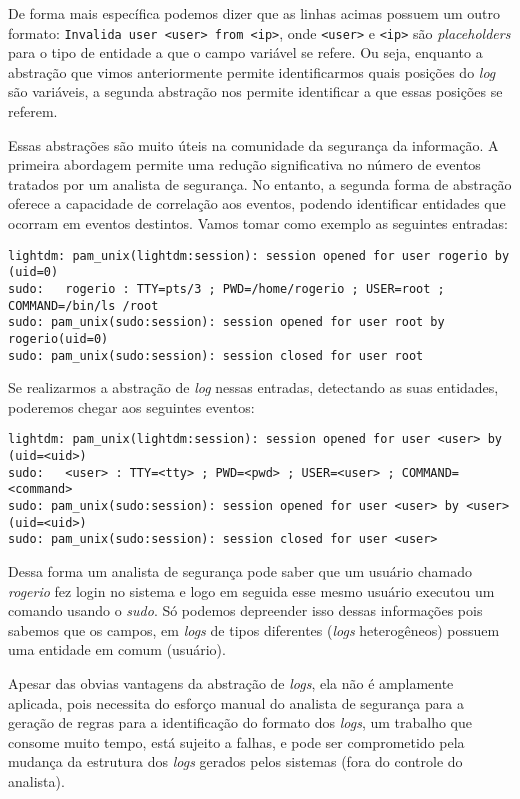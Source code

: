 \documentclass[
	12pt,				%
	openright,			%
	twoside,			%
	a4paper,			%
	english,			%
	spanish,			%
	brazil,				%
	]{abntex2}
\begin{document}
De forma mais específica podemos dizer que as linhas acimas possuem um outro formato: \verb|Invalida user <user> from <ip>|, onde \verb|<user>| e \verb|<ip>| são \emph{placeholders} para o tipo de entidade a que o campo variável se refere. Ou seja, enquanto a abstração que vimos anteriormente permite identificarmos quais posições do \emph{log} são variáveis, a segunda abstração nos permite identificar a que essas posições se referem.

Essas abstrações são muito úteis na comunidade da segurança da informação. A primeira abordagem permite uma redução significativa no número de eventos tratados por um analista de segurança. No entanto, a segunda forma de abstração oferece a capacidade de correlação aos eventos, podendo identificar entidades que ocorram em eventos destintos. Vamos tomar como exemplo as seguintes entradas:

{\small
\begin{verbatim}
lightdm: pam_unix(lightdm:session): session opened for user rogerio by (uid=0)
sudo:   rogerio : TTY=pts/3 ; PWD=/home/rogerio ; USER=root ; COMMAND=/bin/ls /root
sudo: pam_unix(sudo:session): session opened for user root by rogerio(uid=0)
sudo: pam_unix(sudo:session): session closed for user root
\end{verbatim}
}

Se realizarmos a abstração de \emph{log} nessas entradas, detectando as suas entidades, poderemos chegar aos seguintes eventos:

{\small
\begin{verbatim}
lightdm: pam_unix(lightdm:session): session opened for user <user> by (uid=<uid>)
sudo:   <user> : TTY=<tty> ; PWD=<pwd> ; USER=<user> ; COMMAND=<command>
sudo: pam_unix(sudo:session): session opened for user <user> by <user>(uid=<uid>)
sudo: pam_unix(sudo:session): session closed for user <user>
\end{verbatim}
}

Dessa forma um analista de segurança pode saber que um usuário chamado \emph{rogerio} fez login no sistema e logo em seguida esse mesmo usuário executou um comando usando o \emph{sudo}. Só podemos depreender isso dessas informações pois sabemos que os campos, em \emph{logs} de tipos diferentes (\emph{logs} heterogêneos) possuem uma entidade em comum (usuário).

Apesar das obvias vantagens da abstração de \emph{logs}, ela não é amplamente aplicada, pois necessita do esforço manual do analista de segurança para a geração de regras para a identificação do formato dos \emph{logs}, um trabalho que consome muito tempo, está sujeito a falhas, e pode ser comprometido pela mudança da estrutura dos \emph{logs} gerados pelos sistemas (fora do controle do analista).
\end{document}

